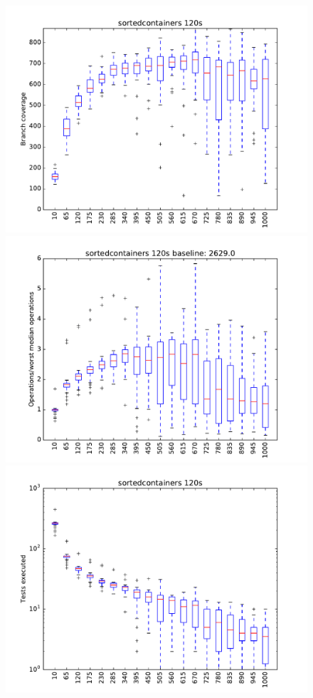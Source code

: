 \begin{figure}
\includegraphics[width=\columnwidth]{graphs/sortedcontainersrand120}
\includegraphics[width=\columnwidth]{graphs/opssortedcontainersrand120}
\includegraphics[width=\columnwidth]{graphs/execsortedcontainersrand120}
\end{figure}

